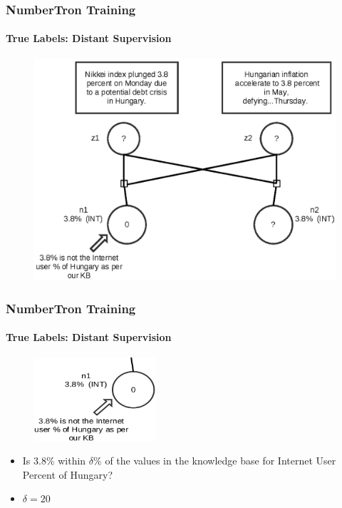 \documentclass{beamer}
\begin{document}
\begin{frame}
\frametitle{NumberTron Training}
\framesubtitle{True Labels: Distant Supervision}
\begin{figure}
\includegraphics[width=\textwidth, height=0.8\textheight]{images/truelabel11.eps}
\end{figure}
\end{frame}

\begin{frame}
\frametitle{NumberTron Training}
\framesubtitle{True Labels: Distant Supervision}
\begin{figure}
\includegraphics[width=0.4\textwidth, height=0.4\textheight]{images/matching.eps}
\end{figure}
\begin{itemize}
 \item Is 3.8\% within $\delta\%$ of the values in the knowledge base for Internet User Percent of Hungary?
 \item $\delta = 20$
\end{itemize}

\end{frame}
\end{document}
